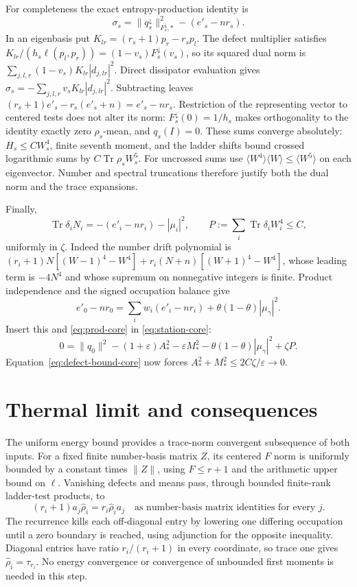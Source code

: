 \documentclass[11pt]{article}
\newcommand{\Tr}{\operatorname{Tr}}
\theoremstyle{remark}\newtheorem{remark}[theorem]{Remark}
\begin{document}
For completeness the exact entropy-production identity is
\begin{equation}\label{eq:prod-core}
 \sigma_s=\|q_s^\downarrow\|_{F_s^\downarrow,*}^2-(e'_s-nr_s).
\end{equation}
In an eigenbasis put $K_{lr}=(r_s+1)p_r-r_sp_l$.
The defect multiplier satisfies
$K_{lr}/(h_s\ell(p_l,p_r))=(1-v_s)F_s^\downarrow(v_s)$,
so its squared dual norm is $\sum_{j,l,r}(1-v_s)K_{lr}|d_{j,lr}|^2$.
Direct dissipator evaluation gives
$\sigma_s=-\sum_{j,l,r}v_s K_{lr}|d_{j,lr}|^2$.
Subtracting leaves $(r_s+1)e'_s-r_s(e'_s+n)=e'_s-nr_s$.
Restriction of the representing vector to centered tests does not alter
its norm: $F_s^\downarrow(0)=1/h_s$ makes orthogonality to the identity
exactly zero $\rho_s$-mean, and $q_s(I)=0$.
These sums converge absolutely: $H_s\le C W_s^4$, finite seventh moment,
and the ladder shifts bound crossed logarithmic sums by $C\Tr\rho_sW_s^5$.
For uncrossed sums use
$\langle W^4\rangle\langle W\rangle\le\langle W^5\rangle$
on each eigenvector. Number and spectral truncations therefore justify
both the dual norm and the trace expansions.

Finally,
\[
 \Tr\delta_iN_i=-(e'_i-nr_i)-|\mu_i|^2,\qquad
 P:=\sum_i\Tr\delta_iW_i^4\le C,
\]
uniformly in $\zeta$. Indeed the number drift polynomial is
$(r_i+1)N[(W-1)^4-W^4]+r_i(N+n)[(W+1)^4-W^4]$,
whose leading term is $-4N^4$ and whose supremum on nonnegative integers
is finite. Product independence and the signed occupation balance give
\[
 e'_0-nr_0=\sum_iw_i(e'_i-nr_i)+\theta(1-\theta)|\mu_\gamma|^2.
\]
Insert this and \eqref{eq:prod-core} in \eqref{eq:station-core}:
\[
 0=\|q_0\|^2-(1+\varepsilon)A_*^2-\varepsilon M_*^2
 -\theta(1-\theta)|\mu_\gamma|^2+\zeta P.
\]
Equation~\eqref{eq:defect-bound-core} now forces
$A_*^2+M_*^2\le2C\zeta/\varepsilon\to0$.

\section{Thermal limit and consequences}
The uniform energy bound provides a trace-norm convergent subsequence of
both inputs. For a fixed finite number-basis matrix $Z$, its centered
$F$ norm is uniformly bounded by a constant times $\|Z\|$, using
$F\le r+1$ and the arithmetic upper bound on $\ell$.
Vanishing defects and means pass, through bounded finite-rank ladder-test
products, to
\[
 (r_i+1)a_j\widehat\rho_i=r_i\widehat\rho_i a_j
 \quad\text{as number-basis matrix identities for every }j.
\]
The recurrence kills each off-diagonal entry by lowering one differing
occupation until a zero boundary is reached, using adjunction for the
opposite inequality. Diagonal entries have ratio $r_i/(r_i+1)$ in every
coordinate, so trace one gives $\widehat\rho_i=\tau_{r_i}$.
No energy convergence or convergence of unbounded first moments is
needed in this step.
\end{document}
